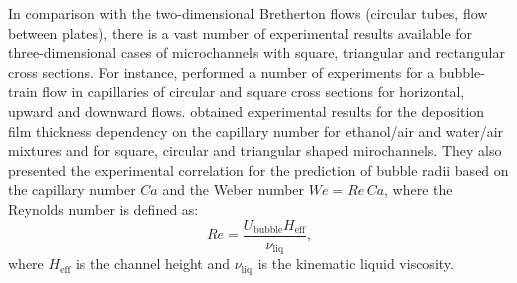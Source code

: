 \documentclass{article}
\begin{document}
In comparison with the two-dimensional Bretherton flows (circular tubes, flow between plates), there
is a vast number of experimental
results available for three-dimensional cases of microchannels with square, triangular and
rectangular cross sections. For instance, \citet{cerro-bubble-train} performed a number of
experiments for a
bubble-train flow in capillaries of
circular and square cross sections for horizontal, upward and downward flows.
\citet{shikazono-square} obtained
experimental
results for the deposition film thickness dependency on the
capillary number for ethanol/air and water/air mixtures and for square, circular and triangular
shaped mirochannels. They also presented the experimental correlation for the prediction of bubble
radii
based on the capillary number $Ca$ and the Weber number $We=Re\,Ca$, where the Reynolds number is
defined as:
\begin{equation}
Re=\frac{U_{\mathrm{bubble}} H_{\mathrm{eff}}}{\nu_{\mathrm{liq}}},
\end{equation}
where $H_{\mathrm{eff}}$ is the channel height and $\nu_{\mathrm{liq}}$ is the kinematic liquid
viscosity.
\end{document}
